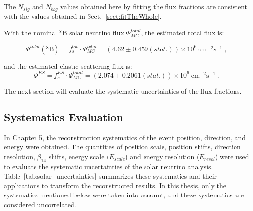 {The $N_{sig}$ and $N_{bkg}$ values obtained here by fitting the flux fractions are consistent with the values obtained in Sect.~\ref{sect:fitTheWhole}.

With the nominal $^8$B solar neutrino flux $\Phi^{total}_{MC}$, the estimated total flux is:

\begin{equation}
\Phi^{total}(\mathrm{^8 B})=f^{tot}_s\cdot \Phi^{total}_{MC}=(4.62 \pm 0.459(stat.))\times 10^6~\mathrm{cm^{-2}s^{-1}}\; ,
\end{equation}

and the estimated elastic scattering flux is:
\begin{equation}
\Phi^{ES}=f^{ES}_s\cdot \Phi^{total}_{MC}=(2.074\pm 0.2061(stat.))\times 10^6~\mathrm{cm^{-2}s^{-1}}\; .
\end{equation}

The next section will evaluate the systematic uncertainties of the flux fractions.

\subsection{Systematics Evaluation}\label{sect:fluxSystem}
In Chapter 5, the reconstruction systematics of the event position, direction, and energy were obtained. The quantities of position scale, position shifts, direction resolution, $\beta_{14}$ shifts, energy scale ($E_{scale}$) and energy resolution ($E_{resol}$) were used to evaluate the systematic uncertainties of the solar neutrino analysis. Table~\ref{tab:solar_uncertainties} summarizes these systematics and their applications to transform the reconstructed results. In this thesis, only the systematics mentioned below were taken into account, and these systematics are considered uncorrelated. 

}
